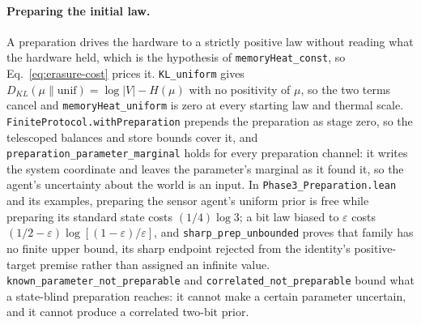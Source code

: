 \documentclass{article}
\begin{document}
\paragraph{Preparing the initial law.}
A preparation drives the hardware to a strictly positive law without reading
what the hardware held, which is the hypothesis of
\nolinkurl{memoryHeat_const}, so Eq.~\eqref{eq:erasure-cost} prices
it. \nolinkurl{KL_uniform} gives
$D_{KL}(\mu\|\mathrm{unif})=\log|V|-H(\mu)$ with no positivity of $\mu$, so the
two terms cancel and \nolinkurl{memoryHeat_uniform} is zero at every
starting law and thermal scale. \nolinkurl{FiniteProtocol.withPreparation}
prepends the preparation as stage zero, so the telescoped balances and store
bounds cover it, and \nolinkurl{preparation_parameter_marginal}
holds for every preparation channel: it writes the system coordinate and leaves
the parameter's marginal as it found it, so the agent's uncertainty about the
world is an input. In \nolinkurl{Phase3_Preparation.lean} and its
examples, preparing the sensor agent's uniform prior is free while preparing its
standard state costs $(1/4)\log3$; a bit law biased to $\varepsilon$ costs
$(1/2-\varepsilon)\log[(1-\varepsilon)/\varepsilon]$, and
\nolinkurl{sharp_prep_unbounded} proves that family has no
finite upper bound, its sharp endpoint rejected from the identity's
positive-target premise rather than assigned an infinite value.
\nolinkurl{known_parameter_not_preparable}
and \nolinkurl{correlated_not_preparable} bound what a
state-blind preparation reaches: it cannot make a certain parameter uncertain,
and it cannot produce a correlated two-bit prior.
\end{document}
